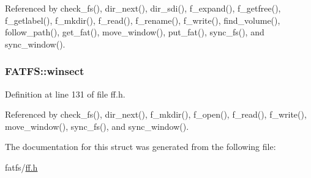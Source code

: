 Referenced by check\+\_\+fs(), dir\+\_\+next(), dir\+\_\+sdi(), f\+\_\+expand(), f\+\_\+getfree(), f\+\_\+getlabel(), f\+\_\+mkdir(), f\+\_\+read(), f\+\_\+rename(), f\+\_\+write(), find\+\_\+volume(), follow\+\_\+path(), get\+\_\+fat(), move\+\_\+window(), put\+\_\+fat(), sync\+\_\+fs(), and sync\+\_\+window().

\subsubsection[{\texorpdfstring{winsect}{winsect}}]{ F\+A\+T\+F\+S\+::winsect}\hypertarget{structFATFS_ac60e69c00e6bf7c25febfbac4dc1476b}{}\label{structFATFS_ac60e69c00e6bf7c25febfbac4dc1476b}


Definition at line 131 of file ff.\+h.



Referenced by check\+\_\+fs(), dir\+\_\+next(), f\+\_\+mkdir(), f\+\_\+open(), f\+\_\+read(), f\+\_\+write(), move\+\_\+window(), sync\+\_\+fs(), and sync\+\_\+window().



The documentation for this struct was generated from the following file\+:\begin{DoxyCompactItemize}
\item 
fatfs/\hyperlink{ff_8h}{ff.\+h}\end{DoxyCompactItemize}
